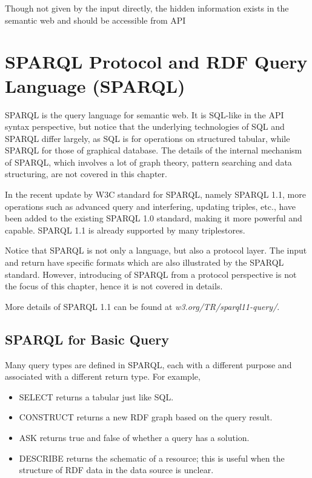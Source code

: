 Though not given by the input directly, the hidden information exists in the semantic web and should be accessible from API

\section{SPARQL Protocol and RDF Query Language (SPARQL)}

SPARQL is the query language for semantic web. It is SQL-like in the API syntax perspective, but notice that the underlying technologies of SQL and SPARQL differ largely, as SQL is for operations on structured tabular, while SPARQL for those of graphical database. The details of the internal mechanism of SPARQL, which involves a lot of graph theory, pattern searching and data structuring, are not covered in this chapter.

In the recent update by W3C standard for SPARQL, namely SPARQL 1.1, more operations such as advanced query and interfering, updating triples, etc., have been added to the existing SPARQL 1.0 standard, making it more powerful and capable. SPARQL 1.1 is already supported by many triplestores. 

Notice that SPARQL is not only a language, but also a protocol layer. The input and return have specific formats which are also illustrated by the SPARQL standard. However, introducing of SPARQL from a protocol perspective is not the focus of this chapter, hence it is not covered in details. 

More details of SPARQL 1.1 can be found at \textit{w3.org/TR/sparql11-query/}.

\subsection{SPARQL for Basic Query}

Many query types are defined in SPARQL, each with a different purpose and associated with a different return type. For example,
\begin{itemize}
	\item SELECT returns a tabular just like SQL.
	\item CONSTRUCT returns a new RDF graph based on the query result.
	\item ASK returns true and false of whether a query has a solution.
	\item DESCRIBE returns the schematic of a resource; this is useful when the structure of RDF data in the data source is unclear.
\end{itemize}

